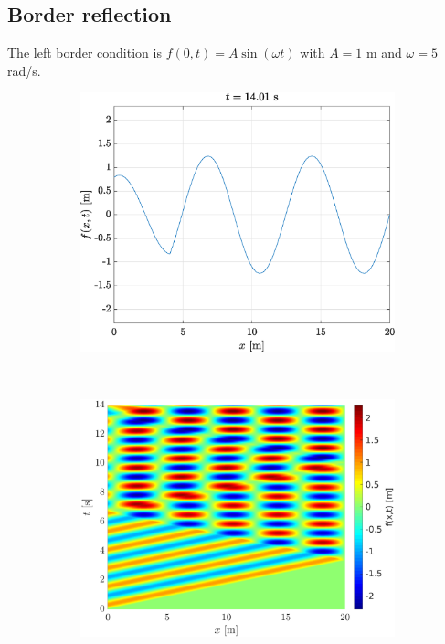 \documentclass[a4paper,12pt,twoside]{article}
\begin{document}
\subsection{Border reflection}
The left border condition is $f(0,t)=A\sin(\omega t)$ with $A=1$ m and $\omega=5$ rad/s.

\begin{figure}[h]
 \begin{subfigure}{0.5\textwidth}
  \includegraphics[width=\textwidth]{graphs/ex1ffixe.eps}
 \end{subfigure}
 ~
 \begin{subfigure}{0.55\textwidth}
  \includegraphics[width=\textwidth]{graphs/ex1xtfixe.eps}
 \end{subfigure}\
 

\end{figure}
\end{document}
